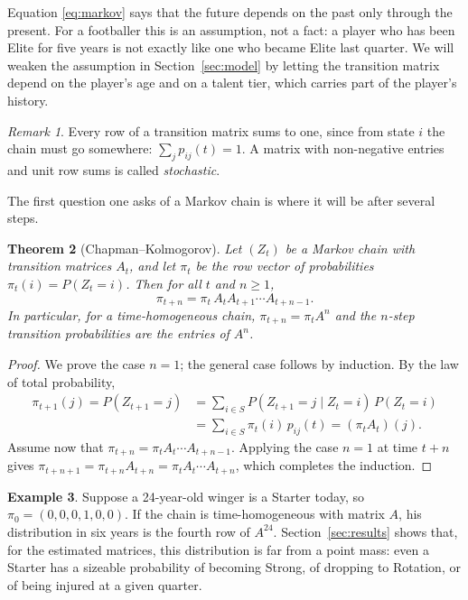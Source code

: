 \documentclass[11pt]{amsart}
\newtheorem{theorem}{Theorem}[section]
\theoremstyle{definition}
\newtheorem{example}[theorem]{Example}
\theoremstyle{remark}
\newtheorem{remark}[theorem]{Remark}
\begin{document}
Equation \eqref{eq:markov} says that the future depends on the past only through the present. For a footballer this is an assumption, not a fact: a player who has been Elite for five years is not exactly like one who became Elite last quarter. We will weaken the assumption in Section~\ref{sec:model} by letting the transition matrix depend on the player's age and on a talent tier, which carries part of the player's history.

\begin{remark}
Every row of a transition matrix sums to one, since from state $i$ the chain must go somewhere: $\sum_{j} p_{ij}(t)=1$. A matrix with non-negative entries and unit row sums is called \emph{stochastic}.
\end{remark}

The first question one asks of a Markov chain is where it will be after several steps.

\begin{theorem}[Chapman--Kolmogorov]\label{thm:ck}
Let $(Z_t)$ be a Markov chain with transition matrices $A_t$, and let $\pi_t$ be the row vector of probabilities $\pi_t(i)=P(Z_t=i)$. Then for all $t$ and $n\ge 1$,
\[
\pi_{t+n} = \pi_t\, A_t A_{t+1}\cdots A_{t+n-1}.
\]
In particular, for a time-homogeneous chain, $\pi_{t+n}=\pi_t A^n$ and the $n$-step transition probabilities are the entries of $A^n$.
\end{theorem}

\begin{proof}
We prove the case $n=1$; the general case follows by induction. By the law of total probability,
\begin{align*}
\pi_{t+1}(j) = P(Z_{t+1}=j) &= \sum_{i\in S} P(Z_{t+1}=j \mid Z_t=i)\,P(Z_t=i)\\
&= \sum_{i\in S} \pi_t(i)\, p_{ij}(t) = (\pi_t A_t)(j).
\end{align*}
Assume now that $\pi_{t+n}=\pi_t A_t\cdots A_{t+n-1}$. Applying the case $n=1$ at time $t+n$ gives $\pi_{t+n+1}=\pi_{t+n}A_{t+n}=\pi_t A_t\cdots A_{t+n}$, which completes the induction.
\end{proof}

\begin{example}\label{ex:saka}
Suppose a 24-year-old winger is a Starter today, so $\pi_0=(0,0,0,1,0,0)$. If the chain is time-homogeneous with matrix $A$, his distribution in six years is the fourth row of $A^{24}$. Section~\ref{sec:results} shows that, for the estimated matrices, this distribution is far from a point mass: even a Starter has a sizeable probability of becoming Strong, of dropping to Rotation, or of being injured at a given quarter.
\end{example}
\end{document}
